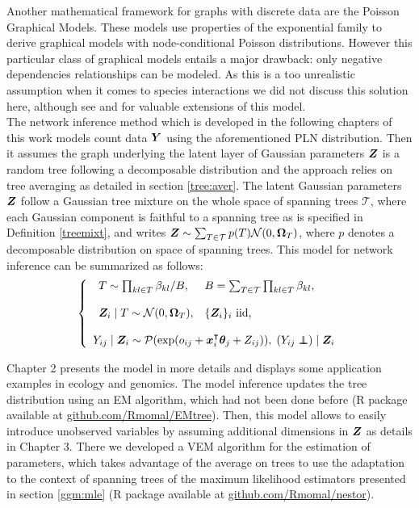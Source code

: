 Another mathematical framework for graphs with discrete data are the Poisson Graphical Models. These models use properties of the exponential family to derive graphical models with node-conditional Poisson distributions. However this particular class of graphical models entails a major drawback: only negative dependencies relationships can be modeled. As this is a too unrealistic assumption when it comes to species interactions we did not discuss this solution here, although see \citet{YRA13} and \citet{IRD16} for valuable extensions of this model. \\
 
 The network inference method which is developed in the following chapters of this work models count data ${\boldsymbol{Y}}$ using the aforementioned PLN distribution. Then it assumes the  graph underlying the latent layer of Gaussian parameters ${\boldsymbol{Z}}$ is a random tree following a  decomposable distribution  and the approach relies on tree averaging as detailed in section \ref{tree:aver}. The latent Gaussian parameters ${\boldsymbol{Z}}$  follow a Gaussian tree mixture on the whole space of spanning trees $\mathcal{T}$, where each Gaussian component is faithful to a spanning tree as is specified in Definition \ref{treemixt}, and writes ${\boldsymbol{Z}} \sim \sum_{T\in \mathcal{T}} p(T) \mathcal{N} (0, {\boldsymbol{\Omega}}_T)$, where $p$ denotes a decomposable distribution on space of spanning trees. This  model for network inference can be summarized as follows:\\
 \begin{equation*}
 \left\{ \begin{array}{l}
 \begin{array}{ll}
 T\sim \prod_{kl\in T} \beta_{kl} / B, &B= \sum_{T\in\mathcal{T}} \prod_{kl \in T} \beta_{kl},\\\\
 \Zbf_i\mid T  \sim \Ncal (0, \Omegab_T), &\{\Zbf_i\}_i \text{ iid, }\\
 \end{array} \\\\
 Y_{ij}\mid \Zbf_i\sim \Pcal (\exp (o_{ij}+\xb_i^\intercal \thetab_j + Z_{ij})), \; (Y_{ij} \independent) \mid \Zbf_i 
 \end{array} \right.
 \end{equation*}
 
\vspace{0.5cm}

Chapter 2 presents the model in more details and displays some application examples in ecology and genomics. The model inference updates the tree distribution using an EM algorithm, which had not been done before (R package available at \url{github.com/Rmomal/EMtree}). Then, this model allows to easily introduce  unobserved variables by assuming additional dimensions in ${\boldsymbol{Z}}$ as details in Chapter 3.  There we developed a VEM algorithm for the estimation of parameters, which takes advantage of the average on trees to use the adaptation to the context of spanning trees of the maximum likelihood estimators presented in section \ref{ggm:mle} (R package available at \url{github.com/Rmomal/nestor}).



  